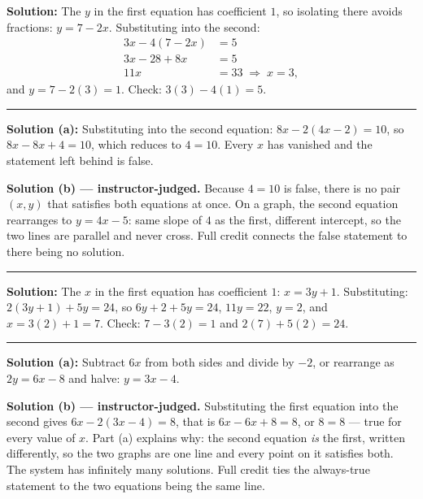 \documentclass[12pt]{article}
\begin{document}
\textbf{Solution:} \quad The $y$ in the first equation has coefficient $1$, so isolating there
avoids fractions: $y = 7 - 2x$. Substituting into the second:
\begin{align*}
  3x - 4(7 - 2x) &= 5\\
  3x - 28 + 8x &= 5\\
  11x &= 33 \;\Rightarrow\; x = 3,
\end{align*}
and $y = 7 - 2(3) = 1$. Check: $3(3) - 4(1) = 5$. 

\vspace{0.15cm}\noindent\rule{\linewidth}{0.2pt}


\textbf{Solution (a):} \quad Substituting into the second equation:
$8x - 2(4x - 2) = 10$, so $8x - 8x + 4 = 10$, which reduces to $4 = 10$. Every $x$ has vanished and
the statement left behind is false. 

\noindent\textbf{Solution (b) --- instructor-judged.} Because $4 = 10$ is false, there is no pair
$(x, y)$ that satisfies both equations at once. On a graph, the second equation rearranges to
$y = 4x - 5$: same slope of $4$ as the first, different intercept, so the two lines are parallel and
never cross. Full credit connects the false statement to there being no solution.

\vspace{0.15cm}\noindent\rule{\linewidth}{0.2pt}


\textbf{Solution:} \quad The $x$ in the first equation has coefficient $1$: $x = 3y + 1$.
Substituting: $2(3y + 1) + 5y = 24$, so $6y + 2 + 5y = 24$, $11y = 22$, $y = 2$, and
$x = 3(2) + 1 = 7$. Check: $7 - 3(2) = 1$ and $2(7) + 5(2) = 24$. 

\vspace{0.15cm}\noindent\rule{\linewidth}{0.2pt}


\textbf{Solution (a):} \quad Subtract $6x$ from both sides and divide by $-2$, or rearrange as
$2y = 6x - 8$ and halve: $y = 3x - 4$. 

\noindent\textbf{Solution (b) --- instructor-judged.} Substituting the first equation into the
second gives $6x - 2(3x - 4) = 8$, that is $6x - 6x + 8 = 8$, or $8 = 8$ --- true for every value of
$x$. Part (a) explains why: the second equation \emph{is} the first, written differently, so the two
graphs are one line and every point on it satisfies both. The system has infinitely many solutions.
Full credit ties the always-true statement to the two equations being the same line.
\end{document}
